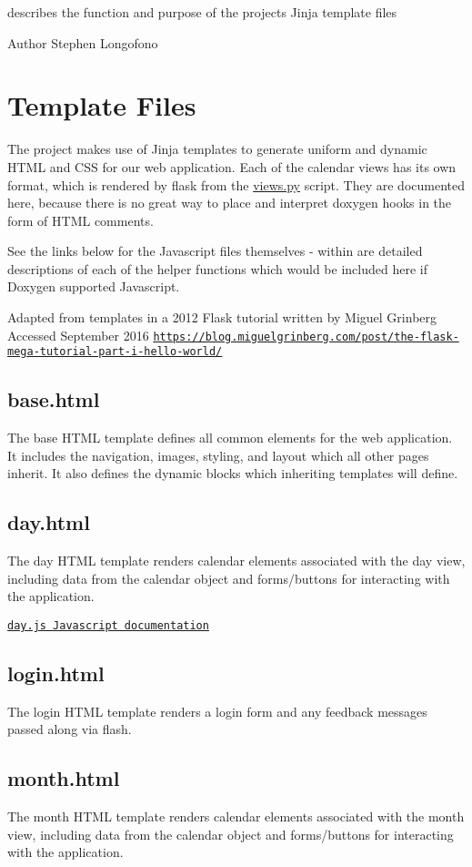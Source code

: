 describes the function and purpose of the project\textquotesingle{}s Jinja template files

\begin{DoxyAuthor}{Author}
Stephen Longofono
\end{DoxyAuthor}
\hypertarget{template_dox_Files}{}\section{Template Files}\label{template_dox_Files}
The project makes use of Jinja templates to generate uniform and dynamic H\+T\+ML and C\+SS for our web application. Each of the calendar views has its own format, which is rendered by flask from the \hyperlink{views_8py}{views.\+py} script. They are documented here, because there is no great way to place and interpret doxygen hooks in the form of H\+T\+ML comments.

See the links below for the Javascript files themselves -\/ within are detailed descriptions of each of the helper functions which would be included here if Doxygen supported Javascript.

Adapted from templates in a 2012 Flask tutorial written by Miguel Grinberg Accessed September 2016 \href{https://blog.miguelgrinberg.com/post/the-flask-mega-tutorial-part-i-hello-world/}{\tt https\+://blog.\+miguelgrinberg.\+com/post/the-\/flask-\/mega-\/tutorial-\/part-\/i-\/hello-\/world/}\hypertarget{template_dox_base}{}\subsection{base.\+html}\label{template_dox_base}
The base H\+T\+ML template defines all common elements for the web application. It includes the navigation, images, styling, and layout which all other pages inherit. It also defines the dynamic blocks which inheriting templates will define.\hypertarget{template_dox_day}{}\subsection{day.\+html}\label{template_dox_day}
The day H\+T\+ML template renders calendar elements associated with the day view, including data from the calendar object and forms/buttons for interacting with the application.

\href{https://github.com/SLongofono/448_Project1/blob/master/app/static/js/day.js}{\tt day.\+js Javascript documentation}\hypertarget{template_dox_login}{}\subsection{login.\+html}\label{template_dox_login}
The login H\+T\+ML template renders a login form and any feedback messages passed along via flash.\hypertarget{template_dox_month}{}\subsection{month.\+html}\label{template_dox_month}
The month H\+T\+ML template renders calendar elements associated with the month view, including data from the calendar object and forms/buttons for interacting with the application.

